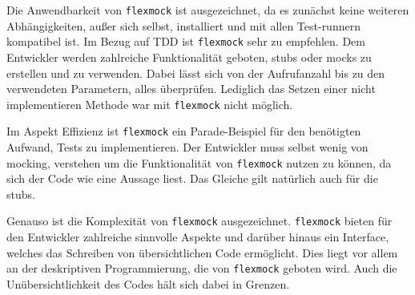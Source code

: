 Die Anwendbarkeit von \lstinline{flexmock} ist ausgezeichnet, da es zunächst
keine weiteren Abhängigkeiten, außer sich selbst, installiert und mit allen
Test-runnern kompatibel ist. Im Bezug auf TDD ist \lstinline{flexmock} sehr zu
empfehlen. Dem Entwickler werden zahlreiche Funktionalität geboten,
\Glspl{stub} oder \Glspl{mock} zu erstellen und zu verwenden. Dabei lässt sich
von der Aufrufanzahl bis zu den verwendeten Parametern, alles überprüfen.
Lediglich das Setzen einer nicht implementieren Methode war mit
\lstinline{flexmock} nicht möglich.

Im Aspekt Effizienz ist \lstinline{flexmock} ein Parade-Beispiel für den 
benötigten Aufwand, Tests zu implementieren. Der Entwickler muss selbst wenig
von \gls{mock}ing, verstehen um die Funktionalität von \lstinline{flexmock}
nutzen zu können, da sich der Code wie eine Aussage liest. Das Gleiche gilt
natürlich auch für die \Glspl{stub}.

Genauso ist die Komplexität von \lstinline{flexmock} ausgezeichnet.
\lstinline{flexmock} bieten für den Entwickler zahlreiche sinnvolle Aspekte und
darüber hinaus  ein Interface, welches das Schreiben von übersichtlichen Code
ermöglicht. Dies liegt vor allem an der deskriptiven Programmierung, die von
\lstinline{flexmock} geboten wird. Auch die Unübersichtlichkeit des Codes hält 
sich dabei in Grenzen.